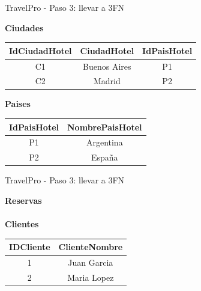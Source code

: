 \documentclass{beamer}
\begin{document}
\begin{frame}{TravelPro - Paso 3: llevar a 3FN}
    \begin{center}
    \textbf{Ciudades}\\[0.1cm]
    \begin{tabular}{ccc}
        \hline
        IdCiudadHotel & CiudadHotel & IdPaisHotel \\
        \hline
        C1 & Buenos Aires & P1 \\
        C2 & Madrid & P2 \\
        \hline
    \end{tabular}
    \vspace{0.4cm}

    \textbf{Paises}\\[0.1cm]
    \begin{tabular}{cc}
        \hline
        IdPaisHotel & NombrePaisHotel \\
        \hline
        P1 & Argentina \\
        P2 & España \\
        \hline
    \end{tabular}
    \end{center}
\end{frame}

\begin{frame}{TravelPro - Paso 3: llevar a 3FN}
    \begin{center}
    \textbf{Reservas}\\[0.1cm]
    \vspace{0.6cm}
    \textbf{\\Clientes}\\[0.1cm]
    \begin{tabular}{cc}
        \hline
        IDCliente & ClienteNombre \\
        \hline
        1 & Juan Garcia \\
        2 & Maria Lopez \\
        \hline
    \end{tabular}
    \end{center}
\end{frame}
\end{document}
